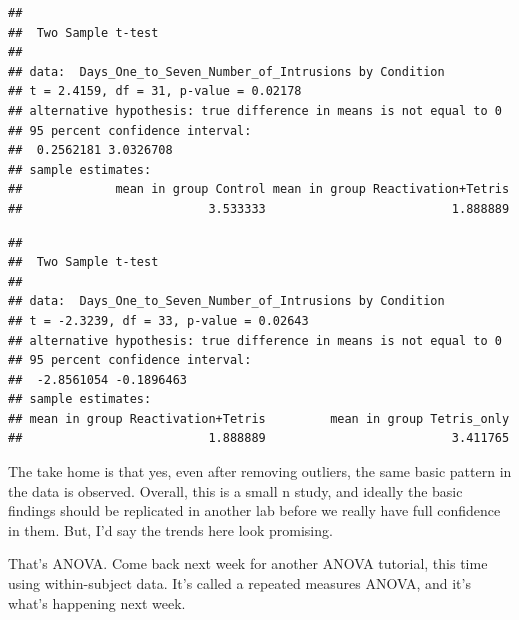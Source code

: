 \documentclass[]{book}
\newenvironment{Shaded}{\begin{snugshade}}{\end{snugshade}}
\newcommand{\KeywordTok}[1]{\textcolor[rgb]{0.13,0.29,0.53}{\textbf{#1}}}
\newcommand{\DataTypeTok}[1]{\textcolor[rgb]{0.13,0.29,0.53}{#1}}
\newcommand{\StringTok}[1]{\textcolor[rgb]{0.31,0.60,0.02}{#1}}
\newcommand{\OtherTok}[1]{\textcolor[rgb]{0.56,0.35,0.01}{#1}}
\newcommand{\OperatorTok}[1]{\textcolor[rgb]{0.81,0.36,0.00}{\textbf{#1}}}
\newcommand{\NormalTok}[1]{#1}
\begin{document}
\begin{verbatim}
## 
##  Two Sample t-test
## 
## data:  Days_One_to_Seven_Number_of_Intrusions by Condition
## t = 2.4159, df = 31, p-value = 0.02178
## alternative hypothesis: true difference in means is not equal to 0
## 95 percent confidence interval:
##  0.2562181 3.0326708
## sample estimates:
##             mean in group Control mean in group Reactivation+Tetris 
##                          3.533333                          1.888889
\end{verbatim}

\begin{Shaded}
\end{Shaded}

\begin{verbatim}
## 
##  Two Sample t-test
## 
## data:  Days_One_to_Seven_Number_of_Intrusions by Condition
## t = -2.3239, df = 33, p-value = 0.02643
## alternative hypothesis: true difference in means is not equal to 0
## 95 percent confidence interval:
##  -2.8561054 -0.1896463
## sample estimates:
## mean in group Reactivation+Tetris         mean in group Tetris_only 
##                          1.888889                          3.411765
\end{verbatim}

The take home is that yes, even after removing outliers, the same basic
pattern in the data is observed. Overall, this is a small n study, and
ideally the basic findings should be replicated in another lab before we
really have full confidence in them. But, I'd say the trends here look
promising.

That's ANOVA. Come back next week for another ANOVA tutorial, this time
using within-subject data. It's called a repeated measures ANOVA, and
it's what's happening next week.
\end{document}

